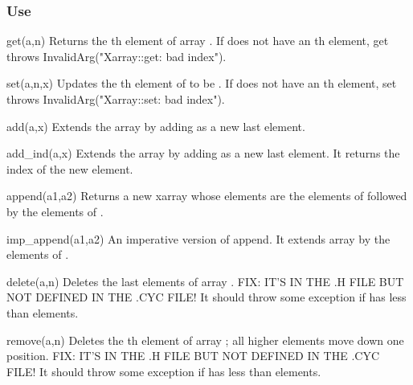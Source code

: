 \subsubsection*{Use}

\begin{defun}{get}{(a,n)}
Returns the th element of array .  If  does not
have an th element, get throws InvalidArg("Xarray::get: bad
index").
\end{defun}

\begin{defun}{set}{(a,n,x)}
Updates the th element of  to be .  If  does
not have an th element, set throws InvalidArg("Xarray::set: bad
index").
\end{defun}

\begin{defun}{add}{(a,x)}
Extends the array  by adding  as a new last element.
\end{defun}

\begin{defun}{add_ind}{(a,x)}
Extends the array  by adding  as a new last element.  It
returns the index of the new element.
\end{defun}

\begin{defun}{append}{(a1,a2)}
Returns a new xarray whose elements are the elements of 
followed by the elements of .
\end{defun}

\begin{defun}{imp_append}{(a1,a2)}
An imperative version of append.  It extends array  by the
elements of .
\end{defun}

\begin{defun}{delete}{(a,n)}
Deletes the last  elements of array .  FIX: IT'S IN THE .H
FILE BUT NOT DEFINED IN THE .CYC FILE!  It should throw some exception
if  has less than  elements.
\end{defun}


\begin{defun}{remove}{(a,n)}
Deletes the th element of array ; all higher elements move
down one position.  FIX: IT'S IN THE .H FILE BUT NOT DEFINED IN THE .CYC
FILE!  It should throw some exception if  has less than 
elements.
\end{defun}

